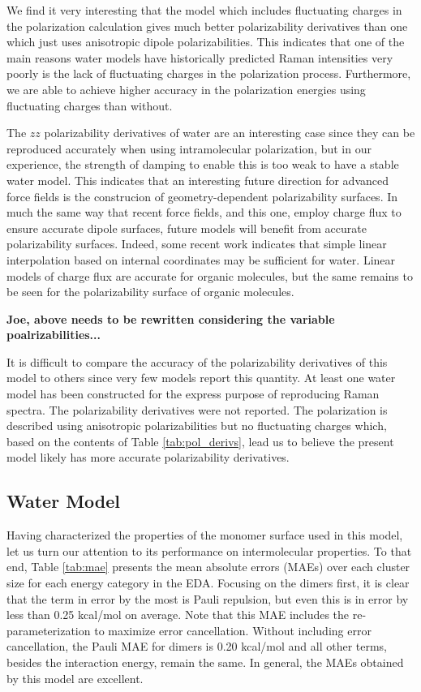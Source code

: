 \documentclass[journal=jctcce,manuscript=article]{achemso}
\begin{document}
We find it very interesting that the model which includes fluctuating charges in the polarization calculation gives much better polarizability derivatives than one which just uses anisotropic dipole polarizabilities. This indicates that one of the main reasons water models have historically predicted Raman intensities very poorly\cite{hamm20142d} is the lack of fluctuating charges in the polarization process. Furthermore, we are able to achieve higher accuracy in the polarization energies using fluctuating charges than without.

The $zz$ polarizability derivatives of water are an interesting case since they can be reproduced accurately when using intramolecular polarization, but in our experience, the strength of damping to enable this is too weak to have a stable water model. This indicates that an interesting future direction for advanced force fields is the construcion of geometry-dependent polarizability surfaces. In much the same way that recent force fields, and this one, employ charge flux to ensure accurate dipole surfaces, future models will benefit from accurate polarizability surfaces. Indeed, some recent work indicates that simple linear interpolation based on internal coordinates may be sufficient for water.\cite{herman2023accurate} Linear models of charge flux are accurate for organic molecules\cite{sedghamiz2017probing,yang2020accurate}, but the same remains to be seen for the polarizability surface of organic molecules.

\textbf{Joe, above needs to be rewritten considering the variable poalrizabilities...}

It is difficult to compare the accuracy of the polarizability derivatives of this model to others since very few models report this quantity. At least one water model has been constructed for the express purpose of reproducing Raman spectra.\cite{sidler2018efficient} The polarizability derivatives were not reported. The polarization is described using anisotropic polarizabilities but no fluctuating charges which, based on the contents of Table \ref{tab:pol_derivs}, lead us to believe the present model likely has more accurate polarizability derivatives.

\subsection*{Water Model}

Having characterized the properties of the monomer surface used in this model, let us turn our attention to its performance on intermolecular properties. To that end, Table \ref{tab:mae} presents the mean absolute errors (MAEs) over each cluster size for each energy category in the EDA. Focusing on the dimers first, it is clear that the term in error by the most is Pauli repulsion, but even this is in error by less than 0.25 kcal/mol on average. Note that this MAE includes the re-parameterization to maximize error cancellation. Without including error cancellation, the Pauli MAE for dimers is 0.20 kcal/mol and all other terms, besides the interaction energy, remain the same. In general, the MAEs obtained by this model are excellent.
\end{document}
